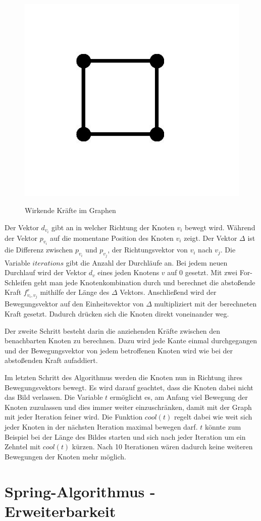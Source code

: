 \begin{figure}[t]
	{\includegraphics[scale=0.3]{bilder/standardgraph}\label{fig_standardgraph}
	}
	\\
	\caption[Wirkende Kräfte im Graphen]{Wirkende Kräfte im Graphen}
	\label{fig_testbild2}
\end{figure} 


Der Vektor $d_{v_{i}}$ gibt an in welcher Richtung der Knoten $v_{i}$ bewegt wird. Während der Vektor $p_{v_{i}}$ auf die momentane Position des Knoten $v_{i}$ zeigt. Der Vektor $\Delta$ ist die Differenz zwischen $p_{v_{i}}$ und $p_{v_{j}}$, der Richtungsvektor von $v_{i}$ nach $v_{j}$. Die Variable $iterations$ gibt die Anzahl der Durchläufe an. Bei jedem neuen Durchlauf wird der Vektor  $d_{v}$  eines jeden Knotens $v$ auf 0 gesetzt. Mit zwei For-Schleifen geht man jede Knotenkombination durch und berechnet die abstoßende Kraft $f^{r}_{v_{i},v_{j}}$ mithilfe der Länge des $\Delta$ Vektors. Anschließend wird der Bewegungsvektor auf den Einheitsvektor von $\Delta$ multipliziert mit der berechneten Kraft gesetzt. Dadurch drücken sich die Knoten direkt voneinander weg.

Der zweite Schritt besteht darin die anziehenden Kräfte zwischen den benachbarten Knoten zu berechnen. Dazu wird jede Kante einmal durchgegangen und der Bewegungsvektor von jedem betroffenen Knoten wird wie bei der abstoßenden Kraft aufaddiert. 

Im letzten Schritt des Algorithmus werden die Knoten nun in Richtung ihres Bewegungsvektors bewegt. Es wird darauf geachtet, dass die Knoten dabei nicht das Bild verlassen. Die Variable $t$ ermöglicht es, am Anfang viel Bewegung der Knoten zuzulassen und dies immer weiter einzuschränken, damit mit der Graph mit jeder Iteration feiner wird. Die Funktion $cool(t)$ regelt dabei wie weit sich jeder Knoten in der nächsten Iteration maximal bewegen darf. $t$ könnte zum Beispiel bei der Länge des Bildes starten und sich nach jeder Iteration um ein Zehntel mit $cool(t)$ kürzen. Nach 10 Iterationen wären dadurch keine weiteren Bewegungen der Knoten mehr möglich.


\section{Spring-Algorithmus - Erweiterbarkeit}
\label{Kapitel_3_-_Unterkapitel_3}   
%